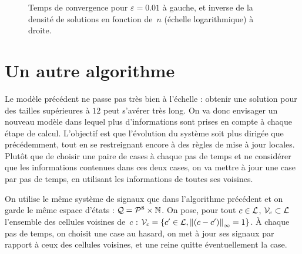 \begin{figure}
  \quad
  \caption{Temps de convergence pour $\varepsilon=0.01$ à gauche, et inverse de
    la densité de solutions en fonction de~$n$ (échelle logarithmique) à droite.}
  \label{fig:densite}
\end{figure} 


\section{Un autre algorithme}

Le modèle précédent ne passe pas très bien à l'échelle : obtenir une solution pour des tailles supérieures à $12$ peut s'avérer très long. On va donc envisager un nouveau modèle dans lequel plus d'informations sont prises en compte à chaque étape de calcul. L'objectif est que l'évolution du système soit plus dirigée que précédemment, tout en se restreignant encore à des règles de mise à jour locales. Plutôt que de choisir une paire de cases à chaque pas de temps et ne considérer que les informations contenues dans ces deux cases, on va mettre à jour une case par pas de temps, en utilisant les informations de toutes ses voisines. 

On utilise le même système de signaux que dans l'algorithme précédent et on garde le même espace d'états : $\mathcal{Q} = {\mathcal{P}^8}\times\mathbb{N}$. On pose, pour tout $c\in\mathcal{L}$, $\mathcal V_c\subset\mathcal{L}$ l'ensemble des cellules voisines de~$c$ : $\mathcal V_c = \{c' \in \mathcal{L}, \left\lVert(c-c')\right\rVert_\infty = 1\}$.
À chaque pas de temps, on choisit une case au hasard, on met à jour ses signaux par rapport à ceux des cellules voisines, et une reine quitte éventuellement la case. 

